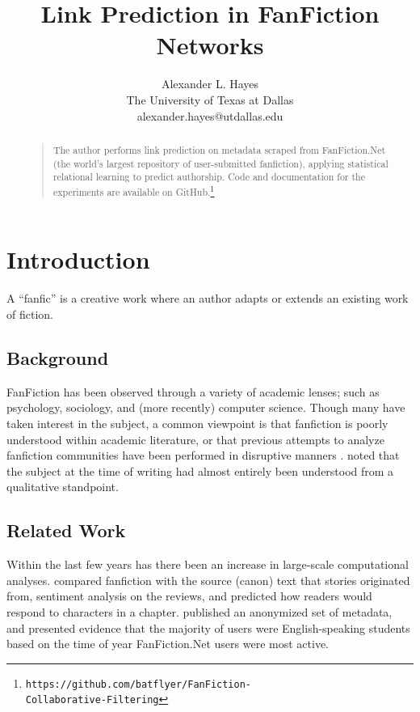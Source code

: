 \documentclass[letterpaper]{article}
\begin{document}
%
\title{Link Prediction in FanFiction Networks}
\author{Alexander L. Hayes\\
The University of Texas at Dallas\\
alexander.hayes@utdallas.edu\\
}

\maketitle
\begin{abstract}
\begin{quote}
The author performs link prediction on metadata scraped from FanFiction.Net (the world's largest repository of user-submitted fanfiction), applying statistical relational learning to predict authorship. Code and documentation for the experiments are available on GitHub.\footnote{\texttt{https://github.com/batflyer/FanFiction-\\Collaborative-Filtering}}
\end{quote}
\end{abstract}

\section{Introduction}
A ``fanfic'' is a creative work where an author adapts or extends an existing work of fiction.

\subsection{Background}

FanFiction has been observed through a variety of academic lenses; such as psychology, sociology, and (more recently) computer science. Though many have taken interest in the subject, a common viewpoint is that fanfiction is poorly understood within academic literature, or that previous attempts to analyze fanfiction communities have been performed in disruptive manners \cite{larsen2011fandom}. \cite{barnes2015fanfiction} noted that the subject at the time of writing had almost entirely been understood from a qualitative standpoint.

\subsection{Related Work}

Within the last few years has there been an increase in large-scale computational analyses. \cite{milli2016beyond} compared fanfiction with the source (canon) text that stories originated from, sentiment analysis on the reviews, and predicted how readers would respond to characters in a chapter. \cite{yin2017no} published an anonymized set of metadata, and presented evidence that the majority of users were English-speaking students based on the time of year FanFiction.Net users were most active.
\end{document}
